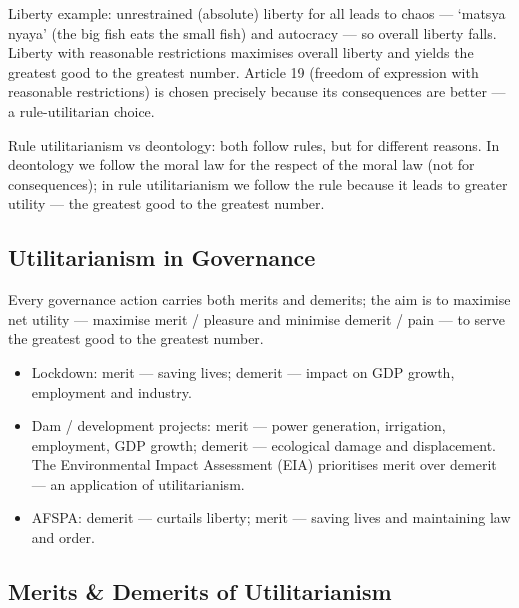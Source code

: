 \begin{GovtPolicy}
Liberty example: unrestrained (absolute) liberty for all leads to chaos --- `matsya nyaya' (the big fish eats the small fish) and autocracy --- so overall liberty falls. Liberty with reasonable restrictions maximises overall liberty and yields the greatest good to the greatest number. Article 19 (freedom of expression with reasonable restrictions) is chosen precisely because its consequences are better --- a rule-utilitarian choice.
\end{GovtPolicy}

\begin{CriticalPoint}
Rule utilitarianism vs deontology: both follow rules, but for different reasons. In deontology we follow the moral law for the respect of the moral law (not for consequences); in rule utilitarianism we follow the rule because it leads to greater utility --- the greatest good to the greatest number.
\end{CriticalPoint}

\subsection{Utilitarianism in Governance}

\begin{KeyConcept}
Every governance action carries both merits and demerits; the aim is to maximise net utility --- maximise merit / pleasure and minimise demerit / pain --- to serve the greatest good to the greatest number.
\end{KeyConcept}

\begin{GovtPolicy}
\begin{itemize}
\item Lockdown: merit --- saving lives; demerit --- impact on GDP growth, employment and industry.
\item Dam / development projects: merit --- power generation, irrigation, employment, GDP growth; demerit --- ecological damage and displacement. The Environmental Impact Assessment (EIA) prioritises merit over demerit --- an application of utilitarianism.
\item AFSPA: demerit --- curtails liberty; merit --- saving lives and maintaining law and order.
\end{itemize}
\end{GovtPolicy}

\subsection{Merits \& Demerits of Utilitarianism}

